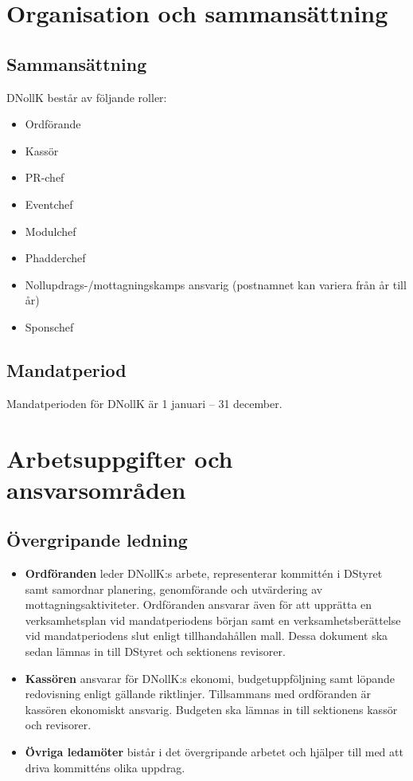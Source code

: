 \documentclass[a4paper]{dtekinstruktion}
\begin{document}
\section{Organisation och sammansättning}
\subsection{Sammansättning}
DNollK består av följande roller:
\begin{itemize}
  \item Ordförande
  \item Kassör
  \item PR-chef
  \item Eventchef
  \item Modulchef
  \item Phadderchef
  \item Nollupdrags-/mottagningskamps ansvarig (postnamnet kan variera från år till år)
  \item Sponschef
\end{itemize}

\subsection{Mandatperiod}
Mandatperioden för DNollK är 1 januari – 31 december.

\section{Arbetsuppgifter och ansvarsområden}
\subsection{Övergripande ledning}
\begin{itemize}
  \item \textbf{Ordföranden} leder DNollK:s arbete, representerar kommittén i DStyret samt samordnar planering, genomförande och utvärdering av mottagningsaktiviteter. Ordföranden ansvarar även för att upprätta en verksamhetsplan vid mandatperiodens början samt en verksamhetsberättelse vid mandatperiodens slut enligt tillhandahållen mall. Dessa dokument ska sedan lämnas in till DStyret och sektionens revisorer.
  \item \textbf{Kassören} ansvarar för DNollK:s ekonomi, budgetuppföljning samt löpande redovisning enligt gällande riktlinjer. Tillsammans med ordföranden är kassören ekonomiskt ansvarig. Budgeten ska lämnas in till sektionens kassör och revisorer.
  \item \textbf{Övriga ledamöter} bistår i det övergripande arbetet och hjälper till med att driva kommitténs olika uppdrag.
\end{itemize}
\end{document}
